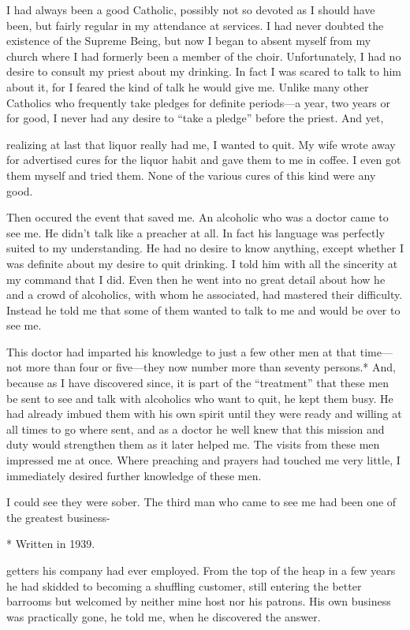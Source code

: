 \begin{biblechapter}
I had always been a good Catholic, possibly not so devoted as I should have been, but fairly regular in my attendance at services. I had never doubted the existence of the Supreme Being, but now I began to absent myself from my church where I had formerly been a member of the choir. Unfortunately, I had no desire to consult my priest about my drinking. In fact I was scared to talk to him about it, for I feared the kind of talk he would give me. Unlike many other Catholics who frequently take pledges for definite periods—a year, two years or for good, I never had any desire to “take a pledge” before the priest. And yet,

realizing at last that liquor really had me, I wanted to quit. My wife wrote away for advertised cures for the liquor habit and gave them to me in coffee. I even got them myself and tried them. None of the various cures of this kind were any good.

Then occured the event that saved me. An alcoholic who was a doctor came to see me. He didn’t talk like a preacher at all. In fact his language was perfectly suited to my understanding. He had no desire to know anything, except whether I was definite about my desire to quit drinking. I told him with all the sincerity at my command that I did. Even then he went into no great detail about how he and a crowd of alcoholics, with whom he associated, had mastered their difficulty. Instead he told me that some of them wanted to talk to me and would be over to see me.

This doctor had imparted his knowledge to just a few other men at that time—not more than four or five—they now number more than seventy persons.* And, because as I have discovered since, it is part of the “treatment” that these men be sent to see and talk with alcoholics who want to quit, he kept them busy. He had already imbued them with his own spirit until they were ready and willing at all times to go where sent, and as a doctor he well knew that this mission and duty would strengthen them as it later helped me. The visits from these men impressed me at once. Where preaching and prayers had touched me very little, I immediately desired further knowledge of these men.

I could see they were sober. The third man who came to see me had been one of the greatest business-

* Written in 1939.

getters his company had ever employed. From the top of the heap in a few years he had skidded to becoming a shuffling customer, still entering the better barrooms but welcomed by neither mine host nor his patrons. His own business was practically gone, he told me, when he discovered the answer.


\end{biblechapter}
